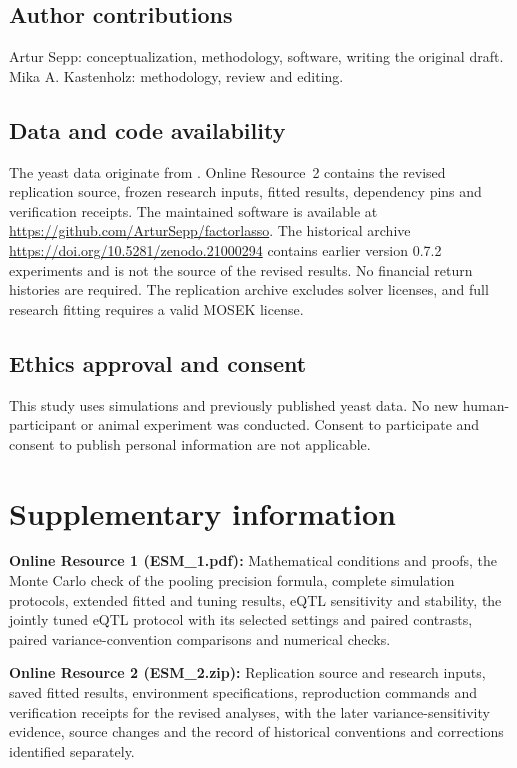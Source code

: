 \documentclass[lineno,pdflatex,sn-basic]{sn-jnl}
\theoremstyle{thmstyleone}
\begin{document}
\subsection*{Author contributions}
Artur Sepp: conceptualization, methodology, software, writing the original
draft. Mika A. Kastenholz: methodology, review and editing.
\subsection*{Data and code availability}
The yeast data originate from \citet{Brem+Kruglyak:2005}. Online Resource~2
contains the revised replication source, frozen research inputs, fitted
results, dependency pins and verification receipts. The maintained software is
available at \url{https://github.com/ArturSepp/factorlasso}. The historical
archive \url{https://doi.org/10.5281/zenodo.21000294} contains earlier version
0.7.2 experiments and is not the source of the revised results. No financial
return histories are required. The replication archive excludes solver
licenses, and full research fitting requires a valid MOSEK license.
\subsection*{Ethics approval and consent}
This study uses simulations and previously published yeast data. No new
human-participant or animal experiment was conducted. Consent to participate
and consent to publish personal information are not applicable.
\section*{Supplementary information}
\textbf{Online Resource 1 (ESM\_1.pdf):} Mathematical conditions and proofs,
the Monte Carlo check of the pooling precision formula, complete simulation
protocols, extended fitted and tuning results, eQTL sensitivity and stability,
the jointly tuned eQTL protocol with its selected settings and paired
contrasts, paired variance-convention comparisons and numerical checks.

\noindent\textbf{Online Resource 2 (ESM\_2.zip):} Replication source and research
inputs, saved fitted results, environment specifications, reproduction commands
and verification receipts for the revised analyses, with the later
variance-sensitivity evidence, source changes and the record of historical
conventions and corrections identified separately.

\end{document}
